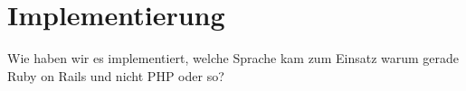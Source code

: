 \part{Implementierung}
Wie haben wir es implementiert, welche Sprache kam zum Einsatz warum gerade Ruby on Rails und nicht PHP oder so?